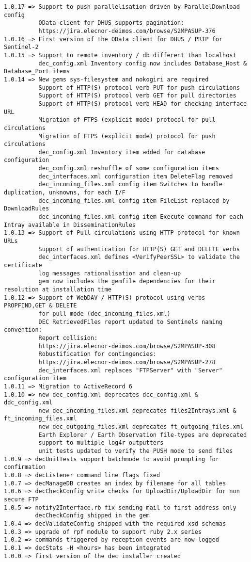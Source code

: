 \documentclass[dec_sum_main.tex]{subfiles}
\begin{document}
\begin{Verbatim}[tabsize=4]
1.0.17 => Support to push parallelisation driven by ParallelDownload config
          OData client for DHUS supports pagination:
          https://jira.elecnor-deimos.com/browse/S2MPASUP-376
1.0.16 => First version of the OData client for DHUS / PRIP for Sentinel-2
1.0.15 => Support to remote inventory / db different than localhost
          dec_config.xml Inventory config now includes Database_Host & Database_Port items
1.0.14 => New gems sys-filesystem and nokogiri are required
          Support of HTTP(S) protocol verb PUT for push circulations
          Support of HTTP(S) protocol verb GET for pull directories
          Support of HTTP(S) protocol verb HEAD for checking interface URL
          Migration of FTPS (explicit mode) protocol for pull circulations
          Migration of FTPS (explicit mode) protocol for push circulations
          dec_config.xml Inventory item added for database configuration
          dec_config.xml reshuffle of some configuration items
          dec_interfaces.xml configuration item DeleteFlag removed
          dec_incoming_files.xml config item Switches to handle duplication, unknowns, for each I/F
          dec_incoming_files.xml config item FileList replaced by DownloadRules
          dec_incoming_files.xml config item Execute command for each Intray available in DisseminationRules
1.0.13 => Support of Pull circulations using HTTP protocol for known URLs
          Support of authentication for HTTP(S) GET and DELETE verbs
          dec_interfaces.xml defines <VerifyPeerSSL> to validate the certificate
          log messages rationalisation and clean-up
          gem now includes the gemfile dependencies for their resolution at installation time
1.0.12 => Support of WebDAV / HTTP(S) protocol using verbs PROPFIND,GET & DELETE
          for pull mode (dec_incoming_files.xml)
          DEC RetrievedFiles report updated to Sentinels naming convention:
          Report collision:
          https://jira.elecnor-deimos.com/browse/S2MPASUP-308
          Robustification for contingencies:
          https://jira.elecnor-deimos.com/browse/S2MPASUP-278
          dec_interfaces.xml replaces "FTPServer" with "Server" configuration item
1.0.11 => Migration to ActiveRecord 6
1.0.10 => new dec_config.xml deprecates dcc_config.xml & ddc_config.xml
          new dec_incoming_files.xml deprecates files2Intrays.xml & ft_incoming_files.xml
          new dec_outgoing_files.xml deprecates ft_outgoing_files.xml
          Earth Explorer / Earth Observation file-types are deprecated
          support to multiple log4r outputters
          unit tests updated to verify the PUSH mode to send files
1.0.9 => decUnitTests support batchmode to avoid prompting for confirmation
1.0.8 => decListener command line flags fixed
1.0.7 => decManageDB creates an index by filename for all tables
1.0.6 => decCheckConfig write checks for UploadDir/UploadDir for non secure FTP
1.0.5 => notify2Interface.rb fix sending mail to first address only 
         decCheckConfig shipped in the gem
1.0.4 => decValidateConfig shipped with the required xsd schemas
1.0.3 => upgrade of rpf module to support ruby 2.x series
1.0.2 => commands triggered by reception events are now logged
1.0.1 => decStats -H <hours> has been integrated
1.0.0 => first version of the dec installer created
\end{Verbatim}
\end{document}
